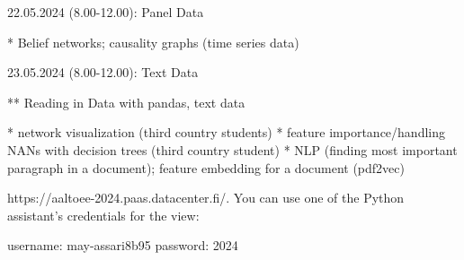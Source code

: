 22.05.2024 (8.00-12.00): Panel Data 

* Belief networks; causality graphs (time series data) 

23.05.2024 (8.00-12.00): Text Data 

** Reading in Data with pandas, text data 


* network visualization (third country students) 
* feature importance/handling NANs  with decision trees (third country student) 
* NLP (finding most important paragraph in a document); feature embedding for a document (pdf2vec)


	
 https://aaltoee-2024.paas.datacenter.fi/. You can use one of the Python assistant's credentials for the view: 

username: may-assari8b95
password: 2024	

	
	
	